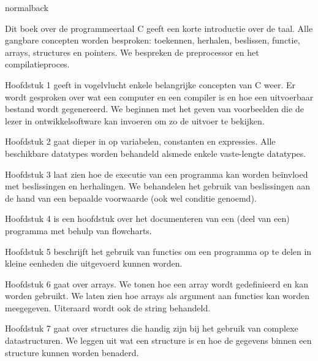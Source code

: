 \documentclass[spinewidth=10.44mm]{bookcover}
\begin{document}
\begin{bookcover}
\begin{bookcoverelement}{normal}{back}
\centering
\vfill
\parbox{110mm}{%
Dit boek over de programmeertaal C geeft een korte introductie over de taal. Alle gangbare concepten worden besproken: toekennen, herhalen, beslissen, functie, arrays, structures en pointers. We bespreken de preprocessor en het compilatieproces.

Hoofdstuk 1 geeft in vogelvlucht enkele belangrijke concepten van  C weer. Er wordt gesproken over wat een computer en een compiler is en hoe een uitvoerbaar bestand wordt gegenereerd. We beginnen met het geven van voorbeelden die de lezer in ontwikkelsoftware kan invoeren om zo de uitvoer te bekijken.

Hoofdstuk 2 gaat dieper in op variabelen, constanten en expressies. Alle beschikbare datatypes worden behandeld alsmede enkele vaste-lengte datatypes.

Hoofdstuk 3 laat zien hoe de executie van een programma kan worden beïnvloed met beslissingen en herhalingen. We behandelen het gebruik van beslissingen aan de hand van een bepaalde voorwaarde (ook wel conditie genoemd).

Hoofdstuk 4 is een hoofdstuk over het documenteren van een (deel van een) programma met behulp van flowcharts.

Hoofdstuk 5 beschrijft het gebruik van functies om een programma op te delen in kleine eenheden die uitgevoerd kunnen worden.

Hoofdstuk 6 gaat over arrays. We tonen hoe een array wordt gedefinieerd en kan worden gebruikt. We laten zien hoe arrays als argument aan functies kan worden meegegeven. Uiteraard wordt ook de string behandeld.

Hoofdstuk 7 gaat over structures die handig zijn bij het gebruik van complexe datastructuren. We leggen uit wat een structure is en hoe de gegevens binnen een structure kunnen worden benaderd. 

}
\end{bookcoverelement}
\end{bookcover}
\end{document}
